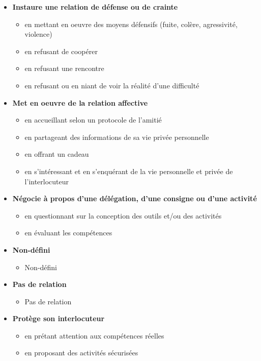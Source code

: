\documentclass[8pt,a4paper]{article}
\begin{document}
\begin{itemize}
\begin{itemize}
 \end{itemize}
\item \textbf{Instaure une relation de défense ou de crainte}
\begin{itemize}
\item en mettant en oeuvre des moyens défensifs (fuite, colère, agressivité, violence)
\item en refusant de coopérer
\item en refusant une rencontre 
\item en refusant ou en niant de voir la réalité d'une difficulté 
\\ 
 \end{itemize}
\item \textbf{Met en oeuvre de la relation affective}
\begin{itemize}
\item en accueillant selon un protocole de l'amitié
\item en partageant des informations de sa vie privée personnelle
\item en offrant un cadeau
\item en s'intéressant et en s'enquérant de la vie personnelle et privée de l'interlocuteur
\\ 
 \end{itemize}
\item \textbf{Négocie à propos d'une délégation, d'une consigne ou d'une activité}
\begin{itemize}
\item en questionnant sur la conception des outils et/ou des activités
\item en évaluant les compétences
\\ 
 \end{itemize}
\item \textbf{Non-défini}
\begin{itemize}
\item Non-défini
\\ 
 \end{itemize}
\item \textbf{Pas de relation}
\begin{itemize}
\item Pas de relation
\\ 
 \end{itemize}
\item \textbf{Protège son interlocuteur}
\begin{itemize}
\item en prétant attention aux compétences réelles
\item en proposant des activités sécurisées

\end{itemize}
\end{itemize}
\end{document}
